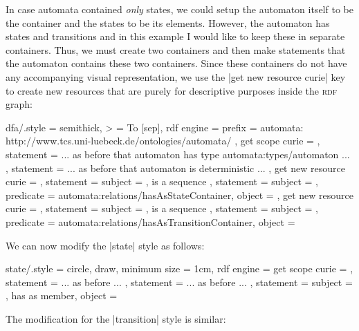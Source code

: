 In case automata contained \emph{only} states, we could setup the
automaton itself to be the container and the states to be its
elements. However, the automaton has states and transitions and in
this example I would like to keep these in separate containers. Thus,
we must create two containers and then make statements that the
automaton contains these two containers. Since these containers do not
have any accompanying visual representation, we use the
|get new resource curie| key to create new resources that are purely
for descriptive purposes inside the \textsc{rdf} graph:


\begin{codeexample}
dfa/.style = {
  semithick, > = To [sep], %
  rdf engine = {
    prefix = { automata: http://www.tcs.uni-luebeck.de/ontologies/automata/ },
    get scope curie = \mylibAutomatonCurie,
    statement = { ... as before that automaton has type automata:types/automaton ... },
    statement = { ... as before that automaton is deterministic ... },
    get new resource curie = \mylibStateContainerCurie,
    statement = {
      subject    = \mylibStateContainerCurie,
      is a sequence },
    statement = {
      subject    = \mylibAutomatonCurie,
      predicate  = automata:relations/hasAsStateContainer,
      object     = \mylibStateContainerCurie },
    get new resource curie = \mylibTransitionContainerCurie,
    statement = {
      subject    = \mylibTransitionContainerCurie,
      is a sequence },
    statement = {
      subject    = \mylibAutomatonCurie,
      predicate  = automata:relations/hasAsTransitionContainer,
      object     = \mylibTransitionContainerCurie } } }
\end{codeexample}

We can now modify the |state| style as follows:

\begin{codeexample}
state/.style = {
  circle, draw, minimum size = 1cm, %
  rdf engine = {
    get scope curie = \mylibStateCurie,
    statement = { ... as before ... },
    statement = { ... as before ... },
    statement = {
      subject     = \mylibStateContainerCurie,
      has as member,
      object      = \mylibStateCurie } } }
\end{codeexample}

The modification for the |transition| style is similar:




